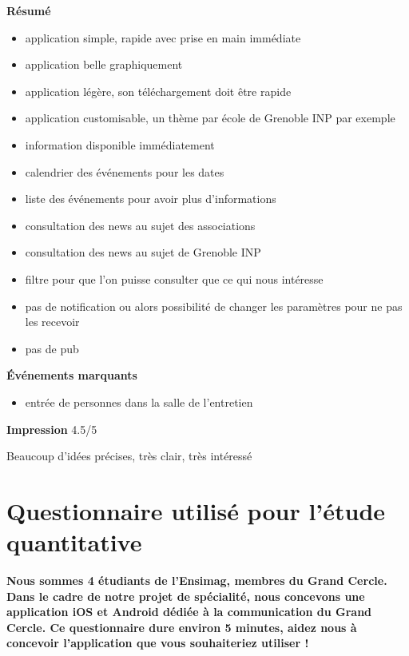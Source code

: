 \documentclass[a4paper, 11px]{article}
\begin{document}
\textbf{Résumé}
	\begin{itemize}
		\item application simple, rapide avec prise en main immédiate
		\item application belle graphiquement
		\item application légère, son téléchargement doit être rapide
		\item application customisable, un thème par école de Grenoble INP par exemple
		\item information disponible immédiatement
		\item calendrier des événements pour les dates
		\item liste des événements pour avoir plus d'informations
		\item consultation des news au sujet des associations
		\item consultation des news au sujet de Grenoble INP
		\item filtre pour que l'on puisse consulter que ce qui nous intéresse
		\item pas de notification ou alors possibilité de changer les paramètres pour ne pas les recevoir
		\item pas de pub
	\end{itemize}

\vspace{.25cm}
\textbf{Événements marquants}
	\begin{itemize}
		\item entrée de personnes dans la salle de l'entretien
	\end{itemize}

\vspace{.25cm}
\textbf{Impression} 4.5/5 

Beaucoup d'idées précises, très clair, très intéressé

\newpage

\section{Questionnaire utilisé pour l'étude quantitative}
\label{q_quantitatif}

 \textbf {\large Nous sommes 4 étudiants de l'Ensimag, membres du Grand Cercle. Dans le cadre de notre projet de spécialité, nous concevons une application iOS et Android dédiée à la communication du Grand Cercle. Ce questionnaire dure environ 5 minutes, aidez nous à concevoir l'application que vous souhaiteriez utiliser !}\\
\end{document}
